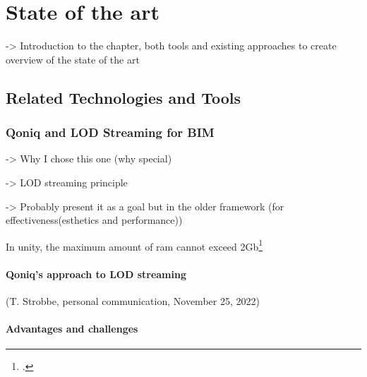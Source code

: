 \chapter{State of the art}
-> Introduction to the chapter, both tools and existing approaches to create overview of the state of the art
\section{Related Technologies and Tools}




\subsection{Qoniq and LOD Streaming for BIM}
-> Why I chose this one (why special)

-> LOD streaming principle

-> Probably present it as a goal but in the older framework (for effectiveness(esthetics and performance))

In unity, the maximum amount of ram cannot exceed 2Gb\footcite{UnityWebGL}

\subsubsection{Qoniq's approach to LOD streaming}
(T. Strobbe, personal communication, November 25, 2022)
\subsubsection{Advantages and challenges}
